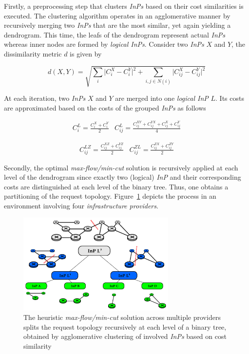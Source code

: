 \documentclass[prodmode,acmtomccap]{acmlarge}
\providecommand{\abs}[1]{\lvert#1\rvert}
\begin{document}
Firstly, a preprocessing step that clusters \emph{InPs} based on their cost similarities is executed. The clustering algorithm operates in an agglomerative manner by recursively merging two
\emph{InPs} that are the most similar, yet again yielding a dendrogram. This time, the leafs of the dendrogram represent actual \emph{InPs}
whereas inner nodes are formed by \emph{logical InPs}. Consider two \emph{InPs} $X$ and $Y$, the dissimilarity metric $d$ is given by

$$
 d(X,Y) = \sqrt{\sum\limits_{i} \abs{C_i^X - C_i^Y}^2 + \sum\limits_{i, j \in N(i)} \abs{C_{ij}^X - C_{ij}^Y}^2}
$$

At each iteration, two \emph{InPs} $X$ and $Y$ are merged into one \emph{logical InP} $L$. Its costs are approximated based on the costs of the grouped \emph{InPs} as follows

$$
\begin{array}{lr}
	C_i^L = \frac{C_i^X + C_i^Y}{2} & C_{ij}^{L} = \frac{C_{ij}^{XY} + C_{ij}^{YX} + C_{ij}^{X} + C_{ij}^{Y} }{4}
\end{array}
$$

$$
\begin{array}{lr}
	C_{ij}^{LZ} = \frac{C_{ij}^{XZ} + C_{ij}^{YZ}}{2} & C_{ij}^{ZL} = \frac{C_{ij}^{ZX} + C_{ij}^{ZY}}{2} 
\end{array}
$$

Secondly, the optimal \emph{max-flow/min-cut} solution is recursively applied at each level of the dendrogram
since exactly two (logical) \emph{InP} and their corresponding costs are distinguished at each level of the binary tree. Thus, one obtains a partitioning of the request topology.
Figure~\ref{fig6} depicts the process in an environment involving four \emph{infrastructure providers}. 

\begin{figure}[htb]
	\centering
	\includegraphics[width=0.7\textwidth]{recursive_heuristic}
	\caption{The heuristic \emph{max-flow/min-cut} solution across multiple providers splits the request topology recursively at each level of a binary tree, obtained 
		by agglomerative clustering of involved \emph{InPs} based on cost similarity}
	\label{fig6}
\end{figure}
\end{document}
